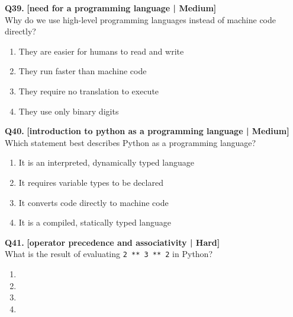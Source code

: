\noindent\textbf{Q39.} \hfill {\small\color{LPUOrange}\textbf{[need for a programming language | Medium]}}\\[2pt]
Why do we use high-level programming languages instead of machine code directly?

\begin{enumerate}[label=(\alph*),topsep=2pt,itemsep=1pt,partopsep=0pt,parsep=0pt]
    \item \relax They are easier for humans to read and write
    \item \relax They run faster than machine code
    \item \relax They require no translation to execute
    \item \relax They use only binary digits
\end{enumerate}
\vspace{2mm}

\noindent\textbf{Q40.} \hfill {\small\color{LPUOrange}\textbf{[introduction to python as a programming language | Medium]}}\\[2pt]
Which statement best describes Python as a programming language?

\begin{enumerate}[label=(\alph*),topsep=2pt,itemsep=1pt,partopsep=0pt,parsep=0pt]
    \item \relax It is an interpreted, dynamically typed language
    \item \relax It requires variable types to be declared
    \item \relax It converts code directly to machine code
    \item \relax It is a compiled, statically typed language
\end{enumerate}
\vspace{2mm}

\noindent\textbf{Q41.} \hfill {\small\color{LPUOrange}\textbf{[operator precedence and associativity | Hard]}}\\[2pt]
What is the result of evaluating \texttt{2 ** 3 ** 2} in Python?

\begin{enumerate}[label=(\alph*),topsep=2pt,itemsep=1pt,partopsep=0pt,parsep=0pt]
    \item {}
    \item {}
    \item {}
    \item {}
\end{enumerate}
\vspace{2mm}


